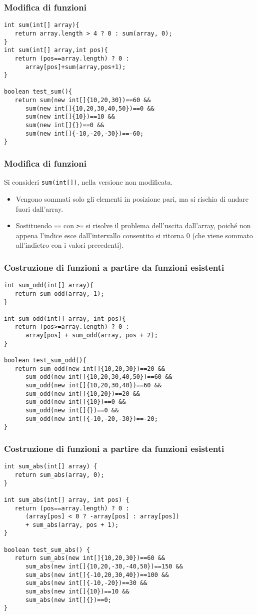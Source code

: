 \documentclass{beamer}
\begin{document}
\begin{frame}[fragile]
\frametitle{Modifica di funzioni}
\begin{verbatim}
int sum(int[] array){
   return array.length > 4 ? 0 : sum(array, 0);
}
int sum(int[] array,int pos){
   return (pos==array.length) ? 0 :
      array[pos]+sum(array,pos+1);
}

boolean test_sum(){
   return sum(new int[]{10,20,30})==60 &&
      sum(new int[]{10,20,30,40,50})==0 &&
      sum(new int[]{10})==10 &&
      sum(new int[]{})==0 &&
      sum(new int[]{-10,-20,-30})==-60;
}
\end{verbatim}

\end{frame}
\begin{frame}[fragile]
\frametitle{Modifica di funzioni}
Si consideri \texttt{sum(int[])}, nella versione non modificata.
\begin{itemize}
 \item Vengono sommati solo gli elementi in posizione pari, ma si rischia di andare fuori dall'array.
 \item Sostituendo \texttt{==} con \texttt{>=} si risolve il problema dell'uscita dall'array, poiché non appena l'indice esce dall'intervallo consentito si ritorna 0 (che viene sommato all'indietro con i valori precedenti).
\end{itemize}
\end{frame}

\begin{frame}[fragile]
\frametitle{Costruzione di funzioni a partire da funzioni esistenti}
\begin{verbatim}
int sum_odd(int[] array){
   return sum_odd(array, 1);
}

int sum_odd(int[] array, int pos){
   return (pos>=array.length) ? 0 :
      array[pos] + sum_odd(array, pos + 2);
}

boolean test_sum_odd(){
   return sum_odd(new int[]{10,20,30})==20 &&
      sum_odd(new int[]{10,20,30,40,50})==60 &&
      sum_odd(new int[]{10,20,30,40})==60 &&
      sum_odd(new int[]{10,20})==20 &&
      sum_odd(new int[]{10})==0 &&
      sum_odd(new int[]{})==0 &&
      sum_odd(new int[]{-10,-20,-30})==-20;
}
\end{verbatim}
\end{frame}

\begin{frame}[fragile]
\frametitle{Costruzione di funzioni a partire da funzioni esistenti}
\begin{verbatim}
int sum_abs(int[] array) {
   return sum_abs(array, 0);
}

int sum_abs(int[] array, int pos) {
   return (pos==array.length) ? 0 :
      (array[pos] < 0 ? -array[pos] : array[pos])
      + sum_abs(array, pos + 1);
}

boolean test_sum_abs() {
   return sum_abs(new int[]{10,20,30})==60 &&
      sum_abs(new int[]{10,20,-30,-40,50})==150 &&
      sum_abs(new int[]{-10,20,30,40})==100 &&
      sum_abs(new int[]{-10,-20})==30 &&
      sum_abs(new int[]{10})==10 &&
      sum_abs(new int[]{})==0;
}
\end{verbatim}
\end{frame}
\end{document}
